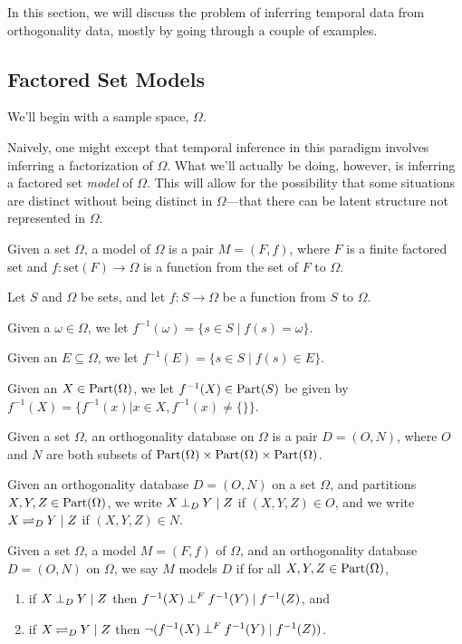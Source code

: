\documentclass[authordate,onecolumn]{miri-tech-article}
\begin{document}
In this section, we will discuss the problem of inferring temporal data from orthogonality data, mostly by going through a couple of examples.
\subsection{Factored Set Models}

We'll begin with a sample space, $\Omega$.

Naively, one might except that temporal inference in this paradigm involves inferring a factorization of $\Omega$. What we'll actually be doing, however, is inferring a factored set \emph{model} of $\Omega$. This will allow for the possibility that some situations are distinct without being distinct in $\Omega$---that there can be latent structure not represented in $\Omega$.

\begin{definition}[model]
Given a set $\Omega$, a model of $\Omega$ is a pair $M=(F,f)$, where $F$ is a finite factored set and $f:\text{set}(F)\rightarrow \Omega$ is a function from the set of $F$ to $\Omega$.
\end{definition}
\begin{definition}
Let $S$ and $\Omega$ be sets, and let $f:S\rightarrow \Omega$ be a function from $S$ to $\Omega$. 

Given a $\omega\in \Omega$, we let $f^{-1}(\omega)=\{s\in S\mid f(s)=\omega\}$. 

Given an $E\subseteq \Omega$, we let $f^{-1}(E)=\{s\in S\mid f(s)\in E\}$. 

Given an $X\in \parts[\Omega]$, we let $f^{-1}(X)\in\parts$ be given by $f^{-1}(X)=\{f^{-1}(x)|x\in X, f^{-1}(x)\neq \{\}\}$.
\end{definition}

\begin{definition}
Given a set $\Omega$, an orthogonality database on $\Omega$ is a pair $D=(O,N)$, where $O$ and $N$ are both subsets of $\parts[\Omega]\times \parts[\Omega]\times\parts[\Omega]$.
\end{definition}

\begin{definition}
Given an orthogonality database $D=(O,N)$ on a set $\Omega$, and partitions $X,Y,Z\in \parts[\Omega]$, we write $\cod{X}{Y}{Z}$ if $(X,Y,Z)\in O$, and we write $\ncod{X}{Y}{Z}$ if $(X,Y,Z)\in N$.
\end{definition}

\begin{definition}
Given a set $\Omega$, a model $M=(F,f)$ of $\Omega$, and an orthogonality database $D=(O,N)$ on $\Omega$, we say $M$ models $D$ if for all $X,Y,Z\in\parts[\Omega]$,
\begin{enumerate}
    \item if $\cod{X}{Y}{Z}$ then $\co{f^{-1}(X)}{f^{-1}(Y)}{f^{-1}(Z)}$, and
    \item if $\ncod{X}{Y}{Z}$ then $\neg(\co{f^{-1}(X)}{f^{-1}(Y)}{f^{-1}(Z)})$.
\end{enumerate}
\end{definition}
\end{document}
